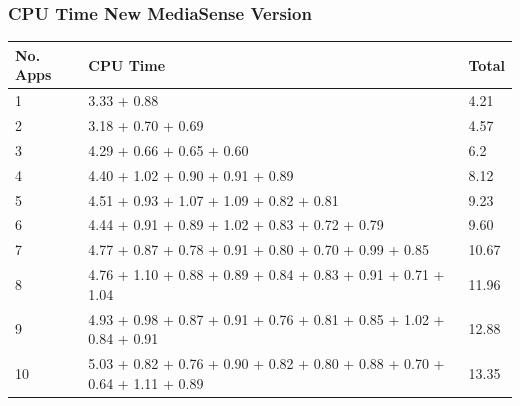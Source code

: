 \subsubsection{CPU Time New MediaSense Version}
\begin{center}
    \begin{tabular}{ | l | p{9cm} | l |}
    \hline
    No. Apps 											& CPU Time	 																	& Total\\ \hline
    1 													& 3.33 + 0.88	 																& 4.21\\ \hline
    2 													& 3.18 + 0.70 + 0.69	 														& 4.57\\ \hline
    3 													& 4.29 + 0.66 + 0.65 + 0.60	 													& 6.2\\ \hline
    4 													& 4.40 + 1.02 + 0.90 + 0.91 + 0.89	 											& 8.12\\ \hline
    5 													& 4.51 + 0.93 + 1.07 + 1.09 + 0.82 + 0.81										& 9.23\\ \hline
    6 													& 4.44 + 0.91 + 0.89 + 1.02 + 0.83 + 0.72 + 0.79 								& 9.60\\ \hline
    7 													& 4.77 + 0.87 + 0.78 + 0.91 + 0.80	+ 0.70 + 0.99 + 0.85 						& 10.67\\ \hline
    8 													& 4.76 + 1.10 + 0.88 + 0.89 + 0.84	+ 0.83 + 0.91 + 0.71 + 1.04 				& 11.96\\ \hline
    9 													& 4.93 + 0.98 + 0.87 + 0.91 + 0.76	+ 0.81 + 0.85 + 1.02 + 0.84 + 0.91			& 12.88\\ \hline
    10 													& 5.03 + 0.82 + 0.76 + 0.90 + 0.82	+ 0.80 + 0.88 + 0.70 + 0.64 + 1.11	+ 0.89	& 13.35\\ \hline
    \end{tabular}
\end{center}




